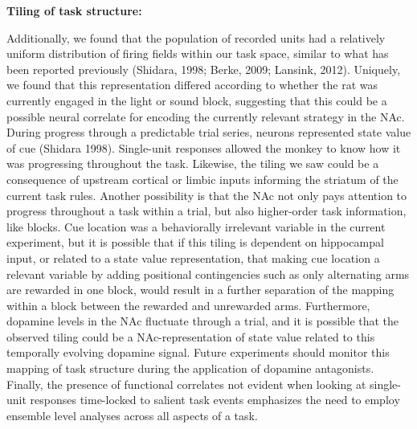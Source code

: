 \documentclass[11pt]{article}
\begin{document}
{\bf Tiling of task structure:}

 Additionally, we found that the population of recorded units had a relatively uniform distribution of firing fields within our task space, similar to what has been reported previously (Shidara, 1998; Berke, 2009; Lansink, 2012). Uniquely, we found that this representation differed according to whether the rat was currently engaged in the light or sound block, suggesting that this could be a possible neural correlate for encoding the currently relevant strategy in the NAc. During progress through a predictable trial series, neurons represented state value of cue (Shidara 1998). Single-unit responses allowed the monkey to know how it was progressing throughout the task. Likewise, the tiling we saw could be a consequence of upstream cortical or limbic inputs informing the striatum of the current task rules. Another possibility is that the NAc not only pays attention to progress throughout a task within a trial, but also higher-order task information, like blocks. Cue location was a behaviorally irrelevant variable in the current experiment, but it is possible that if this tiling is dependent on hippocampal input, or related to a state value representation, that making cue location a relevant variable by adding positional contingencies such as only alternating arms are rewarded in one block, would result in a further separation of the mapping within a block between the rewarded and unrewarded arms. Furthermore, dopamine levels in the NAc fluctuate through a trial, and it is possible that the observed tiling could be a NAc-representation of state value related to this temporally evolving dopamine signal. Future experiments should monitor this mapping of task structure during the application of dopamine antagonists. Finally, the presence of functional correlates not evident when looking at single-unit responses time-locked to salient task events emphasizes the need to employ ensemble level analyses across all aspects of a task.

%
\end{document}
